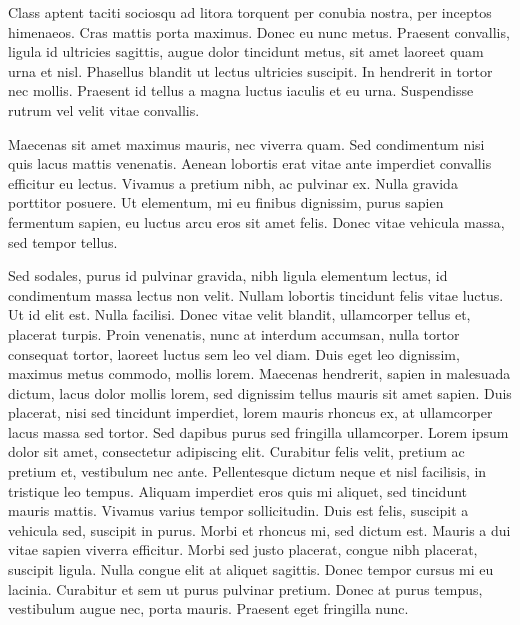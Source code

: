 Class aptent taciti sociosqu ad litora torquent per conubia nostra, per inceptos himenaeos. Cras mattis porta maximus. Donec eu nunc metus. Praesent convallis, ligula id ultricies sagittis, augue dolor tincidunt metus, sit amet laoreet quam urna et nisl. Phasellus blandit ut lectus ultricies suscipit. In hendrerit in tortor nec mollis. Praesent id tellus a magna luctus iaculis et eu urna. Suspendisse rutrum vel velit vitae convallis.

Maecenas sit amet maximus mauris, nec viverra quam. Sed condimentum nisi quis lacus mattis venenatis. Aenean lobortis erat vitae ante imperdiet convallis efficitur eu lectus. Vivamus a pretium nibh, ac pulvinar ex. Nulla gravida porttitor posuere. Ut elementum, mi eu finibus dignissim, purus sapien fermentum sapien, eu luctus arcu eros sit amet felis. Donec vitae vehicula massa, sed tempor tellus.

Sed sodales, purus id pulvinar gravida, nibh ligula elementum lectus, id condimentum massa lectus non velit. Nullam lobortis tincidunt felis vitae luctus. Ut id elit est. Nulla facilisi. Donec vitae velit blandit, ullamcorper tellus et, placerat turpis. Proin venenatis, nunc at interdum accumsan, nulla tortor consequat tortor, laoreet luctus sem leo vel diam. Duis eget leo dignissim, maximus metus commodo, mollis lorem. Maecenas hendrerit, sapien in malesuada dictum, lacus dolor mollis lorem, sed dignissim tellus mauris sit amet sapien. Duis placerat, nisi sed tincidunt imperdiet, lorem mauris rhoncus ex, at ullamcorper lacus massa sed tortor. Sed dapibus purus sed fringilla ullamcorper.
Lorem ipsum dolor sit amet, consectetur adipiscing elit. Curabitur felis velit, pretium ac pretium et, vestibulum nec ante. Pellentesque dictum neque et nisl facilisis, in tristique leo tempus. Aliquam imperdiet eros quis mi aliquet, sed tincidunt mauris mattis. Vivamus varius tempor sollicitudin. Duis est felis, suscipit a vehicula sed, suscipit in purus. Morbi et rhoncus mi, sed dictum est. Mauris a dui vitae sapien viverra efficitur. Morbi sed justo placerat, congue nibh placerat, suscipit ligula. Nulla congue elit at aliquet sagittis. Donec tempor cursus mi eu lacinia. Curabitur et sem ut purus pulvinar pretium. Donec at purus tempus, vestibulum augue nec, porta mauris. Praesent eget fringilla nunc.

